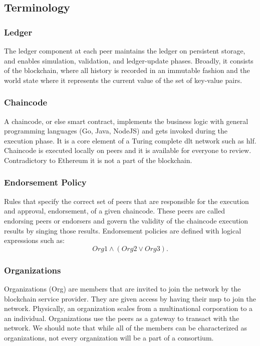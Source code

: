 \subsection{Terminology}
\subsubsection{Ledger}  
The ledger component at each peer maintains the ledger on persistent storage, and enables simulation, validation, and ledger-update phases. Broadly, it consists of the blockchain, where all history is recorded in an immutable fashion and the world state where it represents the current value of the set of key-value pairs. 
\subsubsection{Chaincode}
A chaincode, or else smart contract, implements the business logic with general programming languages (Go, Java, NodeJS) and gets invoked during the execution phase. It is a core element of a Turing complete \acrshort{dlt} network such as \acrshort{hlf}. Chaincode is executed locally on peers and it is available for everyone to review. Contradictory to Ethereum it is not a part of the blockchain.
\subsubsection{Endorsement Policy}
Rules that specify the correct set of peers that are responsible for the execution and approval, endorsement, of a given chaincode. These peers are called endorsing peers or endorsers and govern the validity of the chaincode execution results by singing those results. Endorsement policies are defined with logical expressions such as: $$Org1 \land (Org2 \lor Org3).$$
\subsubsection{Organizations}
Organizations (Org) are members that are invited to join the network by the blockchain service provider. They are given access by having their \acrshort{msp} to join the network. Physically, an organization scales from a multinational corporation to a an individual. Organizations use the peers as a gateway to transact with the network. We should note that while all of the members can be characterized as organizations, not every organization will be a part of a consortium. 
